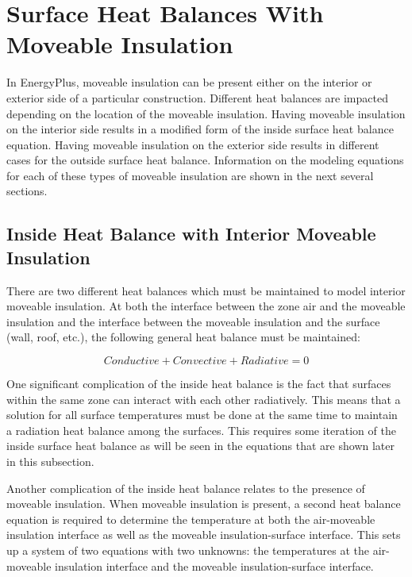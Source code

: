 \section{Surface Heat Balances With Moveable Insulation}\label{surface-heat-balances-with-moveable-insulation}

In EnergyPlus, moveable insulation can be present either on the interior or exterior side of a particular construction. Different heat balances are impacted depending on the location of the moveable insulation.  Having moveable insulation on the interior side results in a modified form of the inside surface heat balance equation.  Having moveable insulation on the exterior side results in different cases for the outside surface heat balance.  Information on the modeling equations for each of these types of moveable insulation are shown in the next several sections.

\subsection{Inside Heat Balance with Interior Moveable Insulation}\label{inside-heat-balance-with-interior-moveable-insulation}

There are two different heat balances which must be maintained to model interior moveable insulation.  At both the interface between the zone air and the moveable insulation and the interface between the moveable insulation and the surface (wall, roof, etc.), the following general heat balance must be maintained:

\begin{equation}
Conductive + Convective + Radiative = 0
\label{eq:BasicSteadyStateHeatBalanceEquation}
\end{equation}

One significant complication of the inside heat balance is the fact that surfaces within the same zone can interact with each other radiatively.  This means that a solution for all surface temperatures must be done at the same time to maintain a radiation heat balance among the surfaces.  This requires some iteration of the inside surface heat balance as will be seen in the equations that are shown later in this subsection.

Another complication of the inside heat balance relates to the presence of moveable insulation.  When moveable insulation is present, a second heat balance equation is required to determine the temperature at both the air-moveable insulation interface as well as the moveable insulation-surface interface.  This sets up a system of two equations with two unknowns: the temperatures at the air-moveable insulation interface and the moveable insulation-surface interface.

